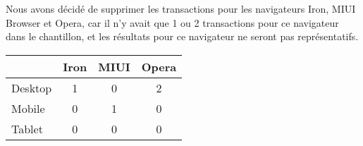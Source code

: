 Nous avons décidé de supprimer les transactions pour les navigateurs Iron, MIUI Browser et Opera, car il n'y avait que 1 ou 2 transactions pour ce navigateur dans le chantillon, et les résultats pour ce navigateur ne seront pas représentatifs.



\begin{table}[]
\begin{tabular}{|l|c|c|c|}
\hline
        & \multicolumn{1}{l|}{Iron} & \multicolumn{1}{l|}{MIUI} & \multicolumn{1}{l|}{Opera} \\ \hline
Desktop & 1                         & 0                         & 2                          \\ \hline
Mobile  & 0                         & 1                         & 0                          \\ \hline
Tablet  & 0                         & 0                         & 0                          \\ \hline
\end{tabular}
\end{table}

